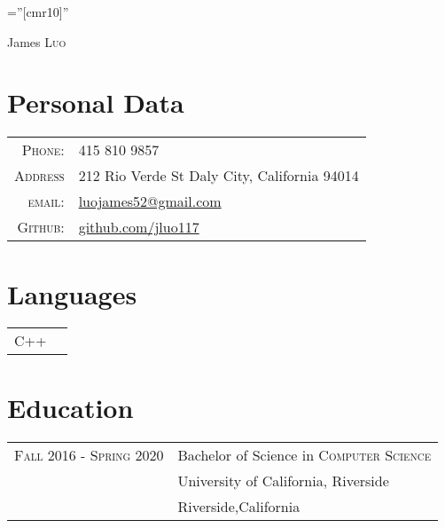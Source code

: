 \documentclass[a4paper,12pt]{article}
\begin{document}

\pagestyle{empty} %

\font\fb=''[cmr10]'' %

\par{\centering
		{\Huge James \textsc{Luo}
	}\bigskip\par}

\section{Personal Data}

\begin{tabular}{rl}
        \textsc{Phone:}     & 415 810 9857\\
        \textsc{Address} & 212 Rio Verde St Daly City, California 94014\\
    \textsc{email:}     & \href{mailto:luojames52@gmail.com}{luojames52@gmail.com}\\
    \textsc{Github:} &
    \href{https://github.com/jluo117}{github.com/jluo117}
\end{tabular}

\section{Languages}
\begin{tabular}{rl}
 
\textsc{C++}\\
\end{tabular}

\section{Education}
\begin{tabular}{rl}	
\textsc{Fall 2016 - Spring 2020} & Bachelor of Science in \textsc{Computer Science}\\
& University of California, Riverside \\
& Riverside,California\\
\end{tabular}
\end{document}
